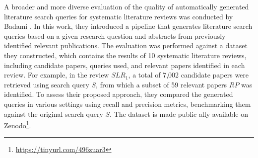 A broader and more diverse evaluation of the quality of automatically generated literature search queries for systematic literature reviews was conducted by Badami \autocite{badami2023adaptive}. In this work, they introduced a pipeline that generates literature search queries based on a given research question and abstracts from previously identified relevant publications. The evaluation was performed against a dataset they constructed, which contains the results of 10 systematic literature reviews, including candidate papers, queries used, and relevant papers identified in each review. For example, in the review $SLR_1$, a total of 7,002 candidate papers were retrieved using search query $S$, from which a subset of 59 relevant papers $RP$ was identified. To assess their proposed approach, they compared the generated queries in various settings using recall and precision metrics, benchmarking them against the original search query $S$. The dataset is made public ally available on Zenodo\footnote{\url{https://tinyurl.com/496zuar3}}.

